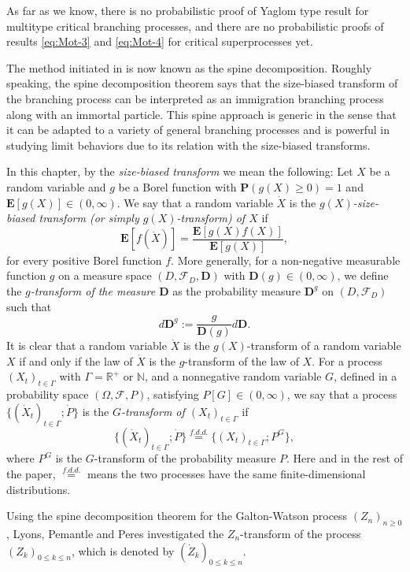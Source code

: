 As far as we know, there is no probabilistic proof of Yaglom type result for multitype critical branching processes, and there are no probabilistic proofs of results \eqref{eq:Mot-3} and \eqref{eq:Mot-4} for critical superprocesses yet.
\par
	The method initiated in \cite{LyonsPemantlePeres1995Conceptual} is now known as the spine decomposition.
	Roughly speaking, the spine decomposition theorem says that the size-biased transform of the branching process can be interpreted as an immigration branching process along with an immortal particle.
	This spine approach is generic in the sense that it can be adapted to a variety of general branching processes and is powerful in studying limit behaviors due to its relation with the size-biased transforms.
\par
	In this chapter, by the \emph{size-biased transform} we mean the following:
	Let $X$ be a random variable and $g$ be a Borel function with $\mathbf P(g(X)\geq 0)=1$ and $\mathbf E[g(X)] \in (0,\infty)$.
	We say that a random variable $\dot X$ is the \emph{$g(X)$-size-biased transform (or simply $g(X)$-transform) of $X$} if
\[
	\mathbf E [f (\dot X)]
	= \frac {\mathbf E[ g(X) f(X)]} {\mathbf E[ g(X)]},
\]
	for every positive Borel function $f$.
	More generally, for a non-negative measurable function $g$ on a measure space $(D,\mathscr F_D,\mathbf D)$ with $\mathbf D(g)\in (0,\infty)$, we define the \emph{$g$-transform of the measure $\mathbf D$} as the probability measure $\mathbf D^g$ on $(D,\mathscr F_D)$ such that
\[
	d\mathbf D^g
	:= \frac{g}{\mathbf D(g)} d\mathbf D.
\]
	It is clear that a random variable $\dot X$ is the $g(X)$-transform of a random variable $X$ if and only if the law of $\dot X$ is the $g$-transform of the law of $X$.
For a process $(X_t)_{t\in \Gamma}$ with $\Gamma = \mathbb R^+$ or $\mathbb N$, and a nonnegative random variable $G$, defined in a probability space $(\Omega,\mathscr F,P)$, satisfying $ P[G] \in (0,\infty)$,
	we say that a process $\{(\dot X_t)_{t\in \Gamma}; \dot P\}$ is the \emph{$G$-transform of  $(X_t)_{t\in \Gamma}$} if
\[
	\{(\dot X_t)_{t\in\Gamma}; \dot P\}
	\overset{f.d.d.}{=} \{(X_t)_{t\in \Gamma}; P^G\},
\]
	where $P^G$ is the $G$-transform of the probability measure $P$.
	Here and in the rest of the paper, $\overset{f.d.d.}{=}$ means the two processes have the same finite-dimensional distributions.
	\par
	Using the spine decomposition theorem for the Galton-Watson process $(Z_n)_{n\geq 0}$, Lyons, Pemantle and Peres \cite{LyonsPemantlePeres1995Conceptual} investigated the $Z_n$-transform of the process $(Z_k)_{0\leq k\leq n}$, which is denoted by $(\dot Z_k)_{0\leq k\leq n}$.
